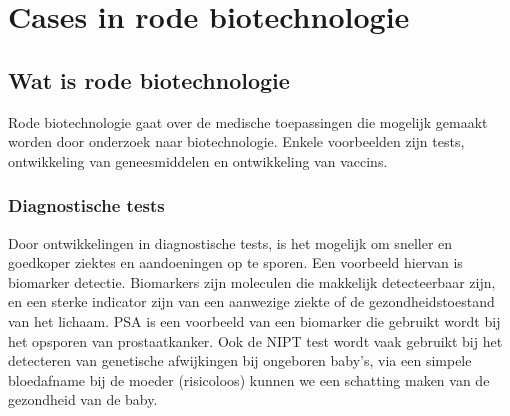\documentclass[a4paper,kul]{kulakarticle} %
\begin{document}
\section{Cases in rode biotechnologie}
\subsection{Wat is rode biotechnologie}
Rode biotechnologie gaat over de medische toepassingen die mogelijk gemaakt worden door onderzoek naar biotechnologie. Enkele voorbeelden zijn tests, ontwikkeling van geneesmiddelen en ontwikkeling van vaccins. 
\subsubsection{Diagnostische tests}
Door ontwikkelingen in diagnostische tests, is het mogelijk om sneller en goedkoper ziektes en aandoeningen op te sporen. Een voorbeeld hiervan is biomarker detectie. Biomarkers zijn moleculen die makkelijk detecteerbaar zijn, en een sterke indicator zijn van een aanwezige ziekte of de gezondheidstoestand van het lichaam. PSA is een voorbeeld van een biomarker die gebruikt wordt bij het opsporen van prostaatkanker. Ook de NIPT test wordt vaak gebruikt bij het detecteren van genetische afwijkingen bij ongeboren baby's, via een simpele bloedafname bij de moeder (risicoloos) kunnen we een schatting maken van de gezondheid van de baby.
\end{document}
